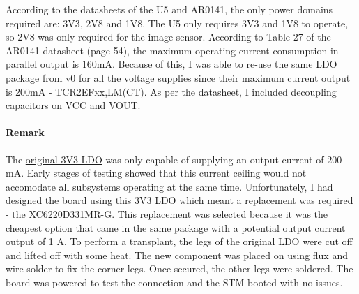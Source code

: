According to the datasheets of the U5 and AR0141, the only power domains required are: 3V3, 2V8 and 1V8. The U5 only requires 3V3 and 1V8 to operate, so 2V8 was only required for the image sensor. According to Table 27 of the AR0141 datasheet (page 54), the maximum operating current consumption in parallel output is 160mA. Because of this, I was able to re-use the same LDO package from v0 for all the voltage supplies since their maximum current output is 200mA - TCR2EFxx,LM(CT).
As per the datasheet, I included decoupling capacitors on VCC and VOUT.
\nl
\begin{indentedfigure}
    \centering

    \caption{Simple power tree diagram of C2Sv0.1}

\end{indentedfigure}

\paragraph{Remark}
The \href{https://au.mouser.com/ProductDetail/Toshiba/TCR2EF33LMCT?qs=EPmvyOv1YlPmhsvS3PaWfg%3D%3D}{original 3V3 LDO} was only capable of supplying an output current of $200$mA. Early stages of testing showed that this current ceiling would not accomodate all subsystems operating at the same time. Unfortunately, I had designed the board using this 3V3 LDO which meant a replacement was required - the \href{https://au.mouser.com/ProductDetail/Torex-Semiconductor/XC6220B331MR-G?qs=AsjdqWjXhJ8lRh0WBUyqoQ%3D%3D}{XC6220D331MR-G}. This replacement was selected because it was the cheapest option that came in the same package with a potential output current output of 1 A.
\nl
To perform a transplant, the legs of the original LDO were cut off and lifted off with some heat. The new component was placed on using flux and wire-solder to fix the corner legs. Once secured, the other legs were soldered.
The board was powered to test the connection and the STM booted with no issues.